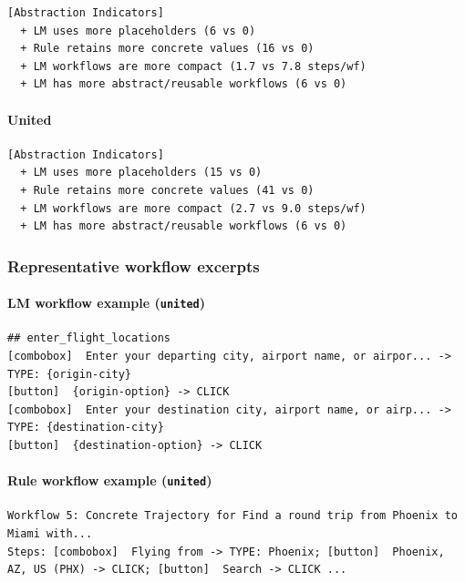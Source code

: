 \begin{verbatim}
[Abstraction Indicators]
  + LM uses more placeholders (6 vs 0)
  + Rule retains more concrete values (16 vs 0)
  + LM workflows are more compact (1.7 vs 7.8 steps/wf)
  + LM has more abstract/reusable workflows (6 vs 0)
\end{verbatim}

\paragraph{United}

\begin{verbatim}
[Abstraction Indicators]
  + LM uses more placeholders (15 vs 0)
  + Rule retains more concrete values (41 vs 0)
  + LM workflows are more compact (2.7 vs 9.0 steps/wf)
  + LM has more abstract/reusable workflows (6 vs 0)
\end{verbatim}

\subsubsection{Representative workflow
excerpts}

\paragraph{\texorpdfstring{LM workflow example
(\texttt{united})}{LM workflow example (united)}}

\begin{verbatim}
## enter_flight_locations
[combobox]  Enter your departing city, airport name, or airpor... -> TYPE: {origin-city}
[button]  {origin-option} -> CLICK
[combobox]  Enter your destination city, airport name, or airp... -> TYPE: {destination-city}
[button]  {destination-option} -> CLICK
\end{verbatim}

\paragraph{\texorpdfstring{Rule workflow example
(\texttt{united})}{Rule workflow example (united)}}

\begin{verbatim}
Workflow 5: Concrete Trajectory for Find a round trip from Phoenix to Miami with...
Steps: [combobox]  Flying from -> TYPE: Phoenix; [button]  Phoenix, AZ, US (PHX) -> CLICK; [button]  Search -> CLICK ...
\end{verbatim}

